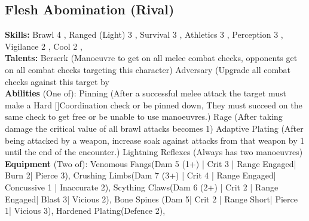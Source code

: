\documentclass{article}
\newcommand\Hard{Hard [\Purple[3]]}
\begin{document}
\begin{multicols}{2}
{\subsection{Flesh Abomination (Rival)}
\begin{center}
\end{center}
\textbf{Skills:}
Brawl 4 \Yellow[3]\Green[1],
Ranged (Light) 3 \Yellow[3],
Survival 3 \Yellow[3],
Athletics 3 \Yellow[3],
Perception 3 \Yellow[3],
Vigilance 2 \Yellow[2]\Green[1],
Cool 2 \Yellow[2]\Green[1],
\\\textbf{Talents:}
Berserk (Manoeuvre to get \Success\Advantage\Advantage on all melee combat checks, opponents get \Success on all combat checks targeting this character)
Adversary (Upgrade all combat checks against this target by \Purple[1]
\\\textbf{Abilities} (One of):
Pinning (After a successful melee attack the target must make a \Hard Coordination check or be pinned down, They must succeed on the same check to get free or be unable to use manoeuvres.)
Rage (After taking damage the critical value of all brawl attacks becomes 1)
Adaptive Plating (After being attacked by a weapon, increase soak against attacks from that weapon by 1 until the end of the encounter.)
Lightning Reflexes (Always has two manoeuvres)
\\\textbf{Equipment} (Two of):
Venomous Fangs(Dam 5 (1+) | Crit 3 | Range Engaged| Burn 2| Pierce 3),
Crushing Limbs(Dam 7 (3+) | Crit 4 | Range Engaged| Concussive 1 | Inaccurate 2),
Scything Claws(Dam 6 (2+) | Crit 2 | Range Engaged| Blast 3| Vicious 2),
Bone Spines (Dam 5| Crit 2 | Range Short| Pierce 1| Vicious 3),
Hardened Plating(Defence 2),
}


\vbox{
}
\end{multicols}
\end{document}
